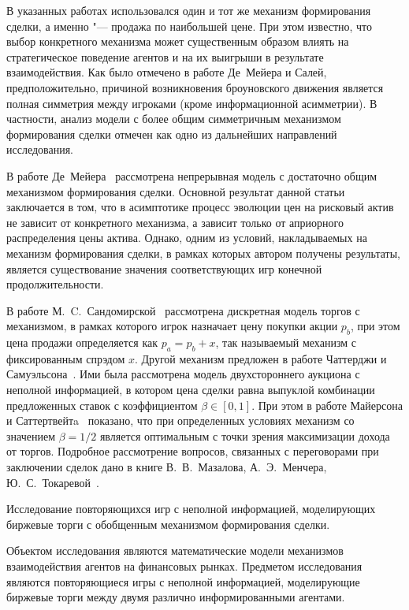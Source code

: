 В указанных работах использовался один и тот же механизм формирования сделки, а именно "--- продажа по наибольшей цене.
При этом известно, что выбор конкретного механизма может существенным образом влиять на стратегическое поведение агентов и на их выигрыши в результате взаимодействия.
Как было отмечено в работе Де~Мейера и Салей, предположительно, причиной возникновения броуновского движения является полная симметрия между игроками (кроме информационной асимметрии).
В частности, анализ модели с более общим симметричным механизмом формирования сделки отмечен как одно из дальнейших направлений исследования.

В работе Де~Мейера~\cite{demeyer10} рассмотрена непрерывная модель с достаточно общим механизмом формирования сделки.
Основной результат данной статьи заключается в том, что в асимптотике процесс эволюции цен на рисковый актив не зависит от конкретного механизма, а зависит только от априорного распределения цены актива.
Однако, одним из условий, накладываемых на механизм формирования сделки, в рамках которых автором получены результаты, является существование значения соответствующих игр конечной продолжительности.

В работе М.~C.~Сандомирской~\cite{sandomirskaya14} рассмотрена дискретная модель торгов с механизмом, в рамках которого игрок назначает цену покупки акции $p_b$, при этом цена продажи определяется как $p_a = p_b + x$, так называемый механизм с фиксированным спрэдом $x$.
Другой механизм предложен в работе Чаттерджи и Самуэльсона~\cite{chatterjee83}.
Ими была рассмотрена модель двухстороннего аукциона с неполной информацией, в котором цена сделки равна выпуклой комбинации предложенных ставок с коэффициентом $\beta \in [0, 1]$.
При этом в работе Майерсона и Саттертвейтa~\cite{myerson83} показано, что при определенных условиях механизм со значением $\beta = 1/2$ является оптимальным с точки зрения максимизации дохода от торгов.
Подробное рассмотрение вопросов, связанных с переговорами при заключении сделок дано в книге В.~В.~Мазалова, А.~Э.~Менчера, Ю.~С.~Токаревой~\cite{mazalov12}.

{\aim} Исследование повторяющихся игр с неполной информацией, моделирующих биржевые торги с обобщенным механизмом формирования сделки.

{\researchsubject} Объектом исследования являются математические модели механизмов взаимодействия агентов на финансовых рынках.
Предметом исследования являются повторяющиеся игры с неполной информацией, моделирующие биржевые торги между двумя различно информированными агентами.

